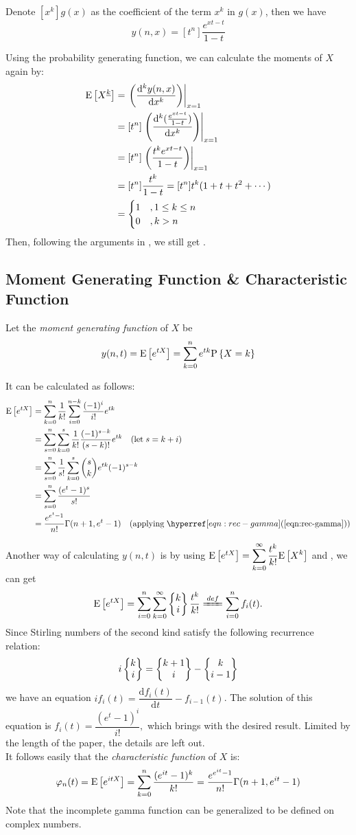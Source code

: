 Denote $ [x^k]g(x)$ as the coefficient of the term $ x^k$ in $ g(x)$, then we have
\[ y(n,x) = [t^n]\dfrac{e^{xt-t}}{1-t}\]

Using the probability generating function, we can calculate the moments of $ X$ again by:
\begin{align*}
  \text{E}\left[X^{\underline{k}}\right] &= \left. \left( \dfrac{\mathrm{d}^k y(n,x)}{\mathrm{d}x^k}\right) \right|_{x=1} \\
  & = [t^n]\left. \left( \dfrac{\mathrm{d}^k(\frac{e^{xt-t}}{1-t})}{\mathrm{d}x^k}\right)\right|_{x=1}\\
  &=[t^n]\left. \left( \dfrac{t^ke^{xt-t}}{1-t}\right)\right|_{x=1}\\
  &=[t^n]\dfrac{t^k}{1-t} = [t^n]t^k(1+t+t^2+\cdots )\\
  &=\begin{cases}1 \quad ,1\le k \le n \\ 0 \quad , k > n\end{cases}
\end{align*}
Then, following the arguments in ,
we still get .

\subsection{Moment Generating Function \& Characteristic Function}
Let the \emph{moment generating function} of $ X$ be
\[ y(n, t) = \E{e^{tX}} = \sum_{k=0}^{n}e^{tk}\Pr{X=k} \]

It can be calculated as follows:
\begin{align*}
  \E{e^{tX}} &=\sum_{k=0}^n\dfrac{1}{k!}\sum_{i=0}^{n-k}\dfrac{(-1)^i}{i!}e^{tk} \\
  &=\sum_{s=0}^n\sum_{k=0}^s\dfrac{1}{k!}\dfrac{(-1)^{s-k}}{(s-k)!}e^{tk} \quad (\text{let}\; s = k+i)\\
  &=\sum_{s=0}^n\dfrac{1}{s!}\sum_{k=0}^{s}{s\choose k}e^{tk}(-1)^{s-k} \\
  &=\sum_{s=0}^n\dfrac{(e^t-1)^s}{s!}\\
  &=\dfrac{e^{e^t-1}}{n!}\Gamma(n+1, e^t-1) \quad (\text{applying}\; \eqnref{rec-gamma})
\end{align*}

Another way of calculating $y(n,t)$ is by using
$ \E{e^{tX}} = \sum_{k=0}^{\infty}\dfrac{t^k}{k!}\E{X^k}$ and , we can get
\[ \E{e^{tX}} = \sum_{i=0}^n\sum_{k=0}^{\infty}\Stir{k}{i}\dfrac{t^k}{k!} \xlongequal{def}\sum_{i=0}^nf_i(t).\]
Since Stirling numbers of the second kind satisfy the following recurrence relation:
\[ i\left\{\begin{matrix}k\\i\end{matrix}\right\} = \left\{\begin{matrix}k+1\\i\end{matrix}\right\}-\left\{\begin{matrix}k\\i-1\end{matrix}\right\}\]
we have an equation $ if_i(t) = \dfrac{\mathrm{d}f_i(t)}{\mathrm{d}t}-f_{i-1}(t)$. The solution of this equation is
$ f_i(t) = \dfrac{(e^t-1)^i}{i!}, $ which brings with the desired result.
Limited by the length of the paper, the details are left out.
\\

It follows easily that the \emph{characteristic function} of $ X$ is:
\[ \varphi_n(t)=\E{e^{itX}}  =\sum_{k=0}^n\dfrac{(e^{it}-1)^k}{k!} =\dfrac{e^{e^{it}-1}}{n!}\Gamma(n+1, e^{it}-1) \]
Note that the incomplete gamma function can be generalized to be defined on complex numbers.
